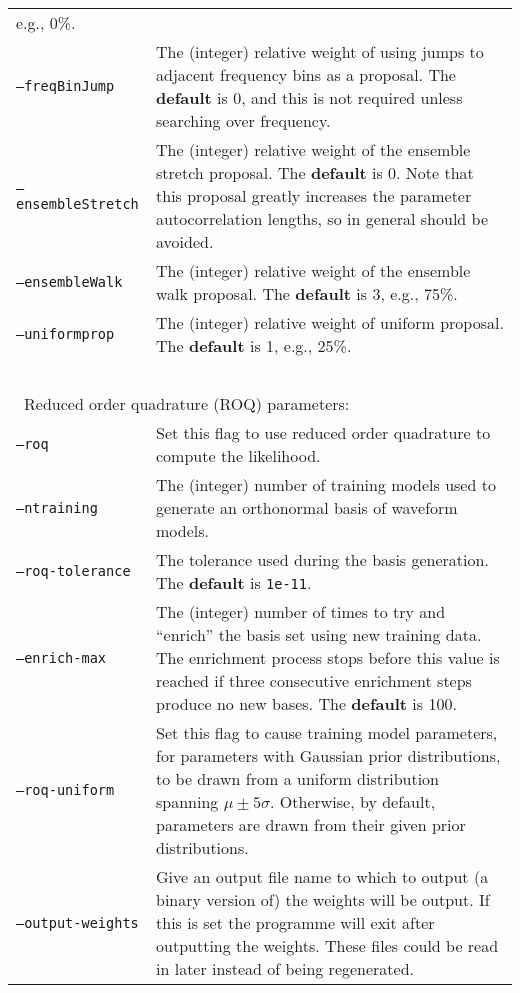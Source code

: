 \begin{footnotesize}
\begin{longtable}{|p{}p{}|}
                            e.g., 0\%. \\
 {\tt --freqBinJump}     &  The (integer) relative weight of using jumps to adjacent frequency bins as a proposal. The {\bf default} is 0, and this is not
                            required unless searching over frequency. \\
 {\tt --ensembleStretch} &  The (integer) relative weight of the ensemble stretch proposal. The {\bf default} is 0. Note that this
                            proposal greatly increases the parameter autocorrelation lengths, so in general should be avoided. \\
 {\tt --ensembleWalk}    &  The (integer) relative weight of the ensemble walk proposal. The {\bf default} is 3, e.g., 75\%. \\
 {\tt --uniformprop}     &  The (integer) relative weight of uniform proposal. The {\bf default} is 1, e.g., 25\%. \\
 ~ & ~ \\
\multicolumn{2}{|l|}{~Reduced order quadrature (ROQ) parameters:} \\
 {\tt --roq}             &  Set this flag to use reduced order quadrature to compute the likelihood. \\
 {\tt --ntraining}       &  The (integer) number of training models used to generate an orthonormal basis of waveform models. \\
 {\tt --roq-tolerance}   &  The tolerance used during the basis generation. The {\bf default} is {\tt 1e-11}. \\
 {\tt --enrich-max}      &  The (integer) number of times to try and ``enrich'' \citep[see, e.g.,][]{2016PhRvD..94d4031S} the basis set using new training
                            data. The enrichment process stops before this value is reached if three consecutive enrichment steps
                            produce no new bases. The {\bf default} is 100. \\ 
 {\tt --roq-uniform}     &  Set this flag to cause training model parameters, for parameters with Gaussian prior distributions, to be drawn from a
                            uniform distribution spanning $\mu \pm 5 \sigma$. Otherwise, by
                            default, parameters are drawn from their given prior distributions. \\
 {\tt --output-weights}  &  Give an output file name to which to output (a binary version of) the weights will be output. If this is set the
                            programme will exit after outputting the weights. These files could be read in later instead of being regenerated.

\end{longtable}
\end{footnotesize}
